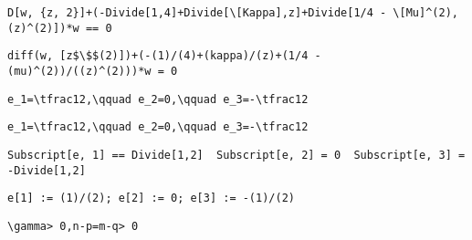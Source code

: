\newsavebox\BTMM
\begin{lrbox}{\BTMM}
 \begin{minipage}[t]{0.82\textwidth}
  \lstinline[language={[latex]TeX},mathescape,breaklines=true]"D[w, {z, 2}]+(-Divide[1,4]+Divide[\[Kappa],z]+Divide[1/4 - \[Mu]^(2),(z)^(2)])*w == 0"
 \end{minipage}
\end{lrbox}
\newsavebox\BTMA
\begin{lrbox}{\BTMA}
 \begin{minipage}[t]{0.82\textwidth}
  \lstinline[language={[latex]TeX},mathescape,breaklines=true]"diff(w, [z$\$$(2)])+(-(1)/(4)+(kappa)/(z)+(1/4 - (mu)^(2))/((z)^(2)))*w = 0"
 \end{minipage}
\end{lrbox}
\newsavebox\BUT
\begin{lrbox}{\BUT}
 \begin{minipage}[t]{0.82\textwidth}
  \lstinline[language={[latex]TeX},mathescape,breaklines=true]"e_1=\tfrac12,\qquad e_2=0,\qquad e_3=-\tfrac12"
 \end{minipage}
\end{lrbox}
\newsavebox\BUST
\begin{lrbox}{\BUST}
 \begin{minipage}[t]{0.82\textwidth}
  \lstinline[language={[latex]TeX},mathescape,breaklines=true]"e_1=\tfrac12,\qquad e_2=0,\qquad e_3=-\tfrac12"
 \end{minipage}
\end{lrbox}
\newsavebox\BUMM
\begin{lrbox}{\BUMM}
 \begin{minipage}[t]{0.82\textwidth}
  \lstinline[language={[latex]TeX},mathescape,breaklines=true]"Subscript[e, 1] == Divide[1,2]  Subscript[e, 2] = 0  Subscript[e, 3] = -Divide[1,2]"
 \end{minipage}
\end{lrbox}
\newsavebox\BUMA
\begin{lrbox}{\BUMA}
 \begin{minipage}[t]{0.82\textwidth}
  \lstinline[language={[latex]TeX},mathescape,breaklines=true]"e[1] := (1)/(2); e[2] := 0; e[3] := -(1)/(2)"
 \end{minipage}
\end{lrbox}
\newsavebox\BVT
\begin{lrbox}{\BVT}
 \begin{minipage}[t]{0.82\textwidth}
  \lstinline[language={[latex]TeX},mathescape,breaklines=true]"\gamma> 0,n-p=m-q> 0"
 \end{minipage}
\end{lrbox}

